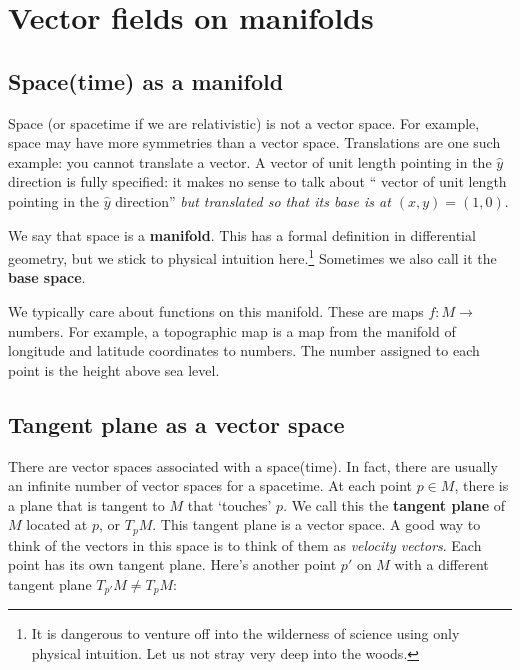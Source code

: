 \documentclass[
  11pt,
	colorful,
	raggedright,
]{tufte-style-thesis-flip}
\begin{document}
\chapter{Vector fields on manifolds}
\label{chap:vector:fields}


\section{Space(time) as a manifold}

Space (or spacetime if we are relativistic) is not a vector space. For example, space may have more symmetries than a vector space. Translations are one such example: you cannot translate a vector. A vector of unit length pointing in the $\hat{y}$ direction is fully specified: it makes no sense to talk about `` vector of unit length pointing in the $\hat{y}$ direction'' \emph{but translated so that its base is at $(x,y)=(1,0)$}. 

We say that space is a \textbf{manifold}. This has a formal definition in differential geometry, but we stick to physical intuition here.\footnote{It is dangerous to venture off into the wilderness of science using only physical intuition. Let us not stray very deep into the woods.} Sometimes we also call it the \textbf{base space}. 

We typically care about functions on this manifold. These are maps $f: M\to$ numbers. For example, a topographic map is a map from the manifold of longitude and latitude coordinates to numbers. The number assigned to each point is the height above sea level. 

\section{Tangent plane as a vector space}

There are vector spaces associated with a space(time). In fact, there are usually an infinite number of vector spaces for a spacetime. At each point $p\in M$, there is a plane that is tangent to $M$ that `touches' $p$. We call this the \textbf{tangent plane} of $M$ located at $p$, or $T_pM$. This tangent plane is a vector space. A good way to think of the vectors in this space is to think of them as \emph{velocity vectors}.
Each point has its own tangent plane. Here's another point $p'$ on $M$ with a different tangent plane $T_{p'}M \neq T_p M$:
\end{document}
